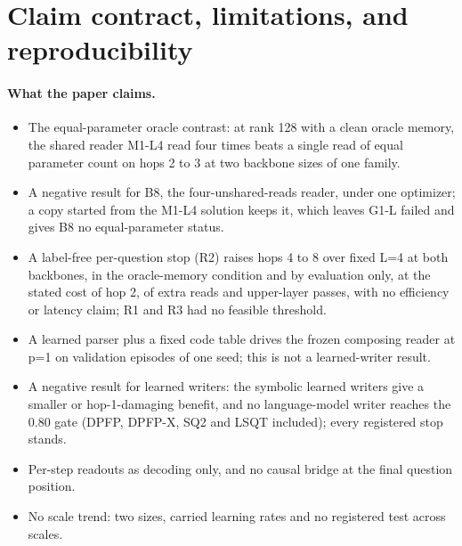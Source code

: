 \section{Claim contract, limitations, and reproducibility}
\label{sec:limits}

\paragraph{What the paper claims.}
\begin{itemize}[leftmargin=1.4em,itemsep=2pt,topsep=3pt]
\item The equal-parameter oracle contrast: at rank 128 with a clean oracle memory, the shared reader M1-L4 read four times beats a single read of equal parameter count on hops 2 to 3 at two backbone sizes of one family.  %
\item A negative result for B8, the four-unshared-reads reader, under one optimizer; a copy started from the M1-L4 solution keeps it, which leaves G1-L failed and gives B8 no equal-parameter status.  %
\item A label-free per-question stop (R2) raises hops 4 to 8 over fixed L=4 at both backbones, in the oracle-memory condition and by evaluation only, at the stated cost of hop 2, of extra reads and upper-layer passes, with no efficiency or latency claim; R1 and R3 had no feasible threshold.  %
\item A learned parser plus a fixed code table drives the frozen composing reader at p=1 on validation episodes of one seed; this is not a learned-writer result.  %
\item A negative result for learned writers: the symbolic learned writers give a smaller or hop-1-damaging benefit, and no language-model writer reaches the 0.80 gate (DPFP, DPFP-X, SQ2 and LSQT included); every registered stop stands.  %
\item Per-step readouts as decoding only, and no causal bridge at the final question position.  %
\item No scale trend: two sizes, carried learning rates and no registered test across scales.  %
\end{itemize}

